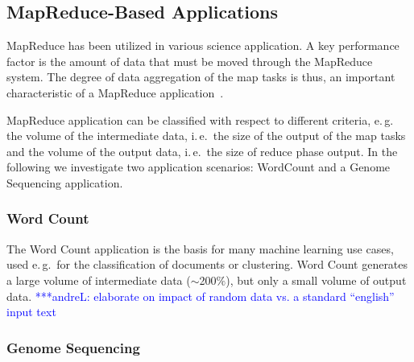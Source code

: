 \documentclass{acm_proc_article-sp}
\newcommand{\alnote}[1]{ {\textcolor{blue} { ***andreL: #1 }}}
\newcommand{\pnote}[1]{ {\textcolor{magenta} { ***pradeep: #1 }}}
\newcommand{\alnote}[1]{}
\newcommand{\pnote}[1]{}
\begin{document}
\subsection{MapReduce-Based Applications}

MapReduce has been utilized in various science application. A key performance 
factor is the amount of data that must be moved through the MapReduce system. 
The degree of data aggregation of the map tasks is thus, an important 
characteristic of a MapReduce application~\cite{weissman-mr-11}.

MapReduce application can be classified with respect to different criteria,
e.\,g.\, the volume of the intermediate data, i.\,e.\ the size of the output
of the map tasks and the volume of the output data, i.\,e.\ the size of reduce
phase output. In the following we investigate two application scenarios: 
WordCount and a Genome Sequencing application.


\subsubsection*{Word Count}

The Word Count application is the basis for many machine learning use cases, 
used e.\,g.\ for the classification of documents or clustering. Word Count 
generates a large volume of intermediate data ($\sim$200$\%$), but only a 
small volume of output data.
\alnote{elaborate on impact of random data vs. a standard ``english'' input text}


\subsubsection*{Genome Sequencing}
\end{document}
